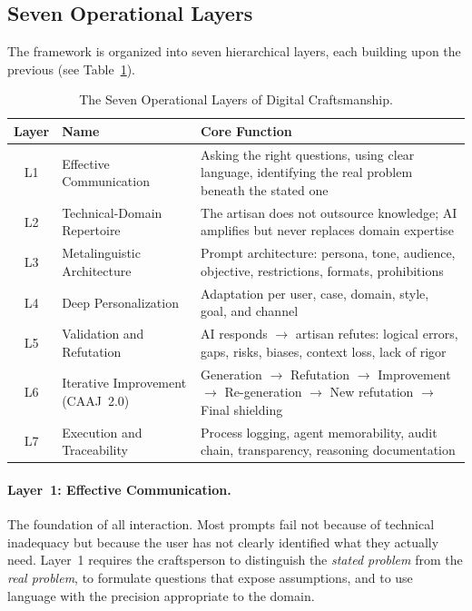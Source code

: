 \documentclass[11pt,a4paper]{article}
\begin{document}
\subsection{Seven Operational Layers}

The framework is organized into seven hierarchical layers, each building upon the previous (see Table~\ref{tab:layers}).

\begin{table}[ht]
\centering
\caption{The Seven Operational Layers of Digital Craftsmanship.}
\label{tab:layers}
\small
\begin{tabular}{@{}clp{7.5cm}@{}}
\toprule
\textbf{Layer} & \textbf{Name} & \textbf{Core Function} \\
\midrule
L1 & Effective Communication & Asking the right questions, using clear language, identifying the real problem beneath the stated one \\
L2 & Technical-Domain Repertoire & The artisan does not outsource knowledge; AI amplifies but never replaces domain expertise \\
L3 & Metalinguistic Architecture & Prompt architecture: persona, tone, audience, objective, restrictions, formats, prohibitions \\
L4 & Deep Personalization & Adaptation per user, case, domain, style, goal, and channel \\
L5 & Validation and Refutation & AI responds $\rightarrow$ artisan refutes: logical errors, gaps, risks, biases, context loss, lack of rigor \\
L6 & Iterative Improvement (CAAJ~2.0) & Generation $\rightarrow$ Refutation $\rightarrow$ Improvement $\rightarrow$ Re-generation $\rightarrow$ New refutation $\rightarrow$ Final shielding \\
L7 & Execution and Traceability & Process logging, agent memorability, audit chain, transparency, reasoning documentation \\
\bottomrule
\end{tabular}
\end{table}

\paragraph{Layer~1: Effective Communication.} The foundation of all interaction. Most prompts fail not because of technical inadequacy but because the user has not clearly identified what they actually need. Layer~1 requires the craftsperson to distinguish the \emph{stated problem} from the \emph{real problem}, to formulate questions that expose assumptions, and to use language with the precision appropriate to the domain.
\end{document}
